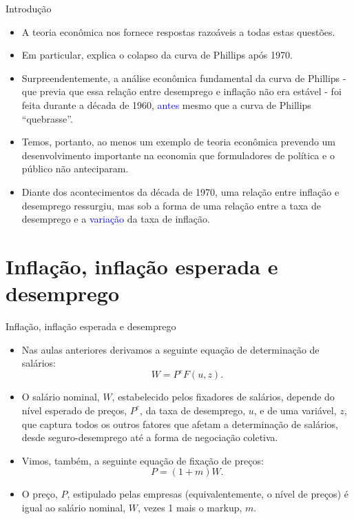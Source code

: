 \documentclass[10pt]{beamer}
\begin{document}
\begin{frame}{Introdução}
    \begin{itemize}
        \item A teoria econômica nos fornece respostas razoáveis a todas estas questões.
        \bigskip
        \item Em particular, explica o colapso da curva de Phillips após 1970.
        \bigskip
        \item Surpreendentemente, a análise econômica fundamental da curva de Phillips - que previa que essa relação entre desemprego e inflação não era estável - foi feita durante a década de 1960, \textcolor{blue}{antes} mesmo que a curva de Phillips ``quebrasse''.
        \bigskip
        \item Temos, portanto, ao menos um exemplo de teoria econômica prevendo um desenvolvimento importante na economia que formuladores de política e o público não anteciparam.
        \bigskip
        \item Diante dos acontecimentos da década de 1970, uma relação entre inflação e desemprego ressurgiu, mas sob a forma de uma relação entre a taxa de desemprego e a \textcolor{blue}{variação} da taxa de inflação.
    \end{itemize}
\end{frame}

\section{Inflação, inflação esperada e desemprego}
\begin{frame}{Inflação, inflação esperada e desemprego}
    \begin{itemize}
        \item Nas aulas anteriores derivamos a seguinte equação de determinação de salários:
        \begin{equation}
            W = P^e F(u,z).
            \label{eq1}
        \end{equation}
        \bigskip
        \item O salário nominal, $W$, estabelecido pelos fixadores de salários, depende do nível esperado de preços, $P^e$, da taxa de desemprego, $u$, e de uma variável, $z$, que captura todos os outros fatores que afetam a determinação de salários, desde seguro-desemprego até a forma de negociação coletiva.
        \bigskip
        \item Vimos, também, a seguinte equação de fixação de preços:
        \begin{equation}
            P = (1 + m)W.
            \label{eq2}
        \end{equation}
        \bigskip
        \item O preço, $P$, estipulado pelas empresas (equivalentemente, o nível de preços) é igual ao salário nominal, $W$, vezes 1 mais o markup, $m$.
    \end{itemize}
\end{frame}
\end{document}
